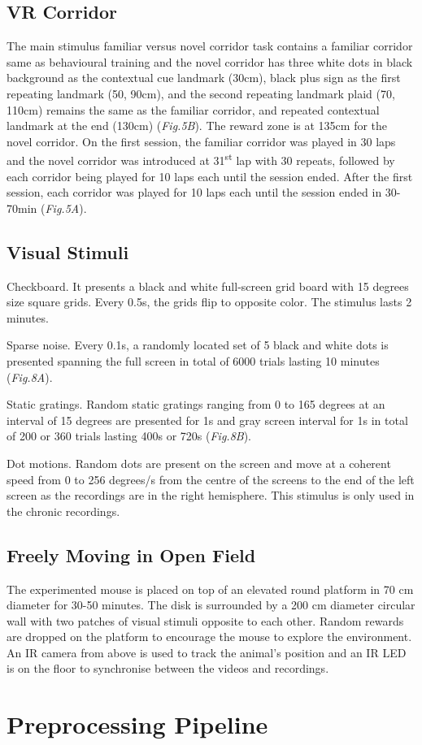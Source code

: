 \subsection{VR Corridor}
The main stimulus familiar versus novel corridor task contains a familiar corridor same as behavioural training and the novel corridor has three white dots in black background as the contextual cue landmark (30cm), black plus sign as the first repeating landmark (50, 90cm), and the second repeating landmark plaid (70, 110cm) remains the same as the familiar corridor, and repeated contextual landmark at the end (130cm) (\textit{Fig.5B}). The reward zone is at 135cm for the novel corridor. On the first session, the familiar corridor was played in 30 laps and the novel corridor was introduced at 31\textsuperscript{st} lap with 30 repeats, followed by each corridor being played for 10 laps each until the session ended. After the first session, each corridor was played for 10 laps each until the session ended in 30-70min (\textit{Fig.5A}). 


\subsection{Visual Stimuli}
Checkboard. It presents a black and white full-screen grid board with 15 degrees size square grids. Every 0.5s, the grids flip to opposite color. The stimulus lasts 2 minutes.

Sparse noise. Every 0.1s, a randomly located set of 5 black and white dots is presented spanning the full screen in total of 6000 trials lasting 10 minutes (\textit{Fig.8A}).

Static gratings. Random static gratings ranging from 0 to 165 degrees at an interval of 15 degrees are presented for 1s and gray screen interval for 1s in total of 200 or 360 trials lasting 400s or 720s (\textit{Fig.8B}).

Dot motions. Random dots are present on the screen and move at a coherent speed from 0 to 256 degrees/s from the centre of the screens to the end of the left screen as the recordings are in the right hemisphere. This stimulus is only used in the chronic recordings.



\subsection{Freely Moving in Open Field}
The experimented mouse is placed on top of an elevated round platform in 70 cm diameter for 30-50 minutes. The disk is surrounded by a 200 cm diameter circular wall with two patches of visual stimuli opposite to each other. Random rewards are dropped on the platform to encourage the mouse to explore the environment. An IR camera from above is used to track the animal's position and an IR LED is on the floor to synchronise between the videos and recordings.



\section{Preprocessing Pipeline}
\blindtext
